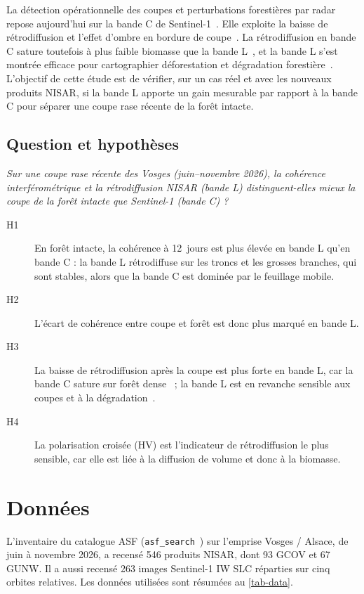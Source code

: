 \documentclass[11pt,a4paper]{article}
\begin{document}
La détection opérationnelle des coupes et perturbations forestières par radar repose aujourd'hui sur la bande C
de Sentinel-1~\cite{torres2012sentinel1}. Elle exploite la baisse de rétrodiffusion et l'effet d'ombre en bordure de
coupe~\cite{bouvet2018shadow,reiche2021radd}. La rétrodiffusion en bande C sature toutefois à plus faible
biomasse que la bande L~\cite{imhoff1995saturation}, et la bande L s'est montrée efficace pour cartographier
déforestation et dégradation forestière~\cite{joshi2015mapping}. L'objectif de cette étude est de vérifier, sur un cas réel et avec les nouveaux
produits NISAR, si la bande L apporte un gain mesurable par rapport à la bande C pour séparer une coupe rase
récente de la forêt intacte.

\subsection{Question et hypothèses}

\emph{Sur une coupe rase récente des Vosges (juin--novembre 2026), la cohérence interférométrique et la
rétrodiffusion NISAR (bande L) distinguent-elles mieux la coupe de la forêt intacte que Sentinel-1 (bande C) ?}

\begin{description}
\item[H1] En forêt intacte, la cohérence à 12~jours est plus élevée en bande L qu'en bande C : la bande L
  rétrodiffuse sur les troncs et les grosses branches, qui sont stables, alors que la bande C est dominée par le
  feuillage mobile.
\item[H2] L'écart de cohérence entre coupe et forêt est donc plus marqué en bande L.
\item[H3] La baisse de rétrodiffusion après la coupe est plus forte en bande L, car la bande C sature sur forêt
  dense~\cite{imhoff1995saturation} ; la bande L est en revanche sensible aux coupes et à la
  dégradation~\cite{joshi2015mapping}.
\item[H4] La polarisation croisée (HV) est l'indicateur de rétrodiffusion le plus sensible, car elle est liée à la
  diffusion de volume et donc à la biomasse.
\end{description}

\section{Données}

L'inventaire du catalogue ASF (\texttt{asf\_search}~\cite{asfsearch}) sur l'emprise Vosges / Alsace, de juin à
novembre 2026, a recensé 546 produits NISAR, dont 93 GCOV et 67 GUNW. Il a aussi recensé 263 images Sentinel-1 IW
SLC réparties sur cinq orbites relatives. Les données utilisées sont résumées au \cref{tab-data}.
\end{document}
